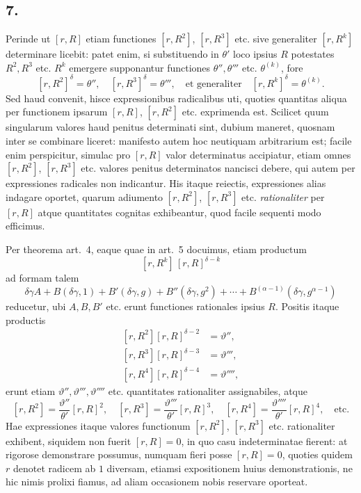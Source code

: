 \documentclass[12pt]{article}
\begin{document}
\subsection*{7.}

Perinde ut $[r,R]$ etiam functiones $[r,R^2]$, $[r,R^3]$ etc. sive generaliter $[r,R^k]$ determinare licebit: patet enim, si substituendo in $\theta'$ loco ipsius $R$ potestates $R^2,R^3$ etc. $R^k$ emergere supponantur functiones $\theta'',\theta'''$ etc. $\theta^{(k)}$, fore
\[
[r,R^2]^\delta=\theta'',\quad [r,R^3]^\delta=\theta''',\quad \text{et generaliter}\quad
[r,R^k]^\delta=\theta^{(k)}.
\]
Sed haud convenit, hisce expressionibus radicalibus uti, quoties quantitas aliqua per functionem ipsarum $[r,R]$, $[r,R^2]$ etc. exprimenda est. Scilicet quum singularum valores haud penitus determinati sint, dubium maneret, quosnam inter se combinare liceret: manifesto autem hoc neutiquam arbitrarium est; facile enim perspicitur, simulac pro $[r,R]$ valor determinatus accipiatur, etiam omnes $[r,R^2]$, $[r,R^3]$ etc. valores penitus determinatos nancisci debere, qui autem per expressiones radicales non indicantur. His itaque reiectis, expressiones alias indagare oportet, quarum adiumento $[r,R^2]$, $[r,R^3]$ etc. \emph{rationaliter} per $[r,R]$ atque quantitates cognitas exhibeantur, quod facile sequenti modo efficimus.

Per theorema art.~4, eaque quae in art.~5 docuimus, etiam productum
\[
[r,R^k]\,[r,R]^{\delta-k}
\]
ad formam talem
\[
\delta\gamma A+B(\delta\gamma,1)+B'(\delta\gamma,g)+B''(\delta\gamma,g^2)+\cdots+
B^{(\alpha-1)}(\delta\gamma,g^{\alpha-1})
\]
reducetur, ubi $A,B,B'$ etc. erunt functiones rationales ipsius $R$. Positis itaque productis
\[
\begin{aligned}
[r,R^2][r,R]^{\delta-2}&=\vartheta'',\\
[r,R^3][r,R]^{\delta-3}&=\vartheta''',\\
[r,R^4][r,R]^{\delta-4}&=\vartheta'''' ,
\end{aligned}
\]
erunt etiam $\vartheta'',\vartheta''',\vartheta''''$ etc. quantitates rationaliter assignabiles, atque
\[
[r,R^2]=\frac{\vartheta''}{\theta'}[r,R]^2,\quad
[r,R^3]=\frac{\vartheta'''}{\theta'}[r,R]^3,\quad
[r,R^4]=\frac{\vartheta''''}{\theta'}[r,R]^4,\quad\text{etc.}
\]
Hae expressiones itaque valores functionum $[r,R^2]$, $[r,R^3]$ etc. rationaliter exhibent, siquidem non fuerit $[r,R]=0$, in quo casu indeterminatae fierent: at rigorose demonstrare possumus, numquam fieri posse $[r,R]=0$, quoties quidem $r$ denotet radicem ab $1$ diversam, etiamsi expositionem huius demonstrationis, ne hic nimis prolixi fiamus, ad aliam occasionem nobis reservare oporteat.
\end{document}
